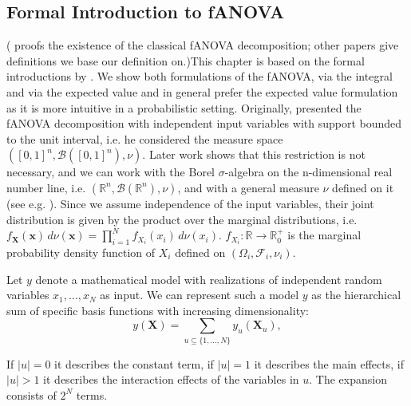 \subsection{Formal Introduction to fANOVA}
(\cite{sobol1993sensitivity} proofs the existence of the classical fANOVA decomposition; other papers give definitions we base our definition on.)This chapter is based on the formal introductions by \cite{rahman2014, sobol1993sensitivity, sobol2001, hooker2004, owen2013, muehlenstaedt2012}. We show both formulations of the fANOVA, via the integral and via the expected value and in general prefer the expected value formulation as it is more intuitive in a probabilistic setting.
Originally, \cite{sobol1993sensitivity} presented the fANOVA decomposition with independent input variables with support bounded to the unit interval, i.e. he considered the measure space $([0, 1]^n, \mathcal{B}([0, 1]^n), \nu)$. Later work shows that this restriction is not necessary, and we can work with the Borel $\sigma$-algebra on the n-dimensional real number line, i.e. $(\mathbb{R}^n, \mathcal{B}(\mathbb{R}^n), \nu)$, and with a general measure $\nu$ defined on it (see e.g. \cite{rahman2014}).
Since we assume independence of the input variables, their joint distribution is given by the product over the marginal distributions, i.e. \(f_{\boldsymbol{X}}(\boldsymbol{x}) \, d\nu(\boldsymbol{x}) = \prod_{i=1}^{N} f_{X_i}(x_i) \, d\nu(x_i)\). \(f_{X_i}: \mathbb{R} \rightarrow \mathbb{R}_{0}^{+}\) is the marginal probability density function of \(X_i\) defined on $(\Omega_i, \mathcal{F}_i, \nu_i)$.

\begin{definition}
Let $y$  denote a mathematical model with realizations of independent random variables $x_1, \dots, x_N$ as input. We can represent such a model $y$ as the hierarchical sum of specific basis functions with increasing dimensionality:
\begin{equation}
    y(\boldsymbol{X}) = \sum_{u \subseteq \{1, \dots, N\}} y_{u}(\boldsymbol{X}_u),
    \label{eq:fanova_decomposition}
\end{equation}
\end{definition}

If $|u| = 0$ it describes the constant term, if $|u| = 1$ it describes the main effects, if $|u| > 1$ it describes the interaction effects of the variables in $u$. The expansion consists of $2^N$ terms.\par

